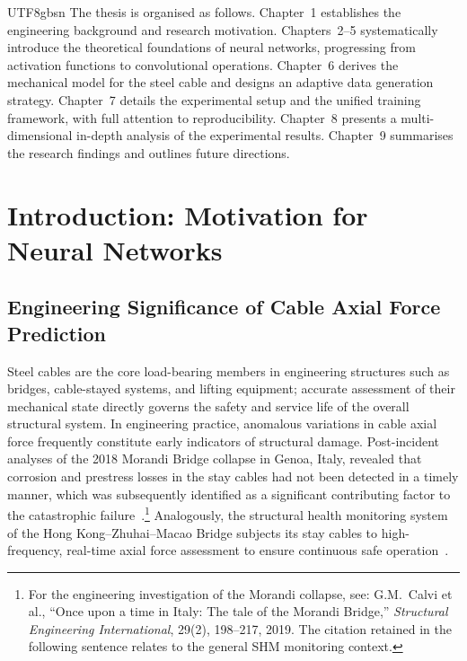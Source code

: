 \documentclass[a4paper,12pt]{report}
\begin{document}
\begin{CJK}{UTF8}{gbsn}
The thesis is organised as follows. Chapter~1 establishes the engineering background and
research motivation. Chapters~2--5 systematically introduce the theoretical foundations of
neural networks, progressing from activation functions to convolutional operations.
Chapter~6 derives the mechanical model for the steel cable and designs an adaptive data
generation strategy. Chapter~7 details the experimental setup and the unified training
framework, with full attention to reproducibility. Chapter~8 presents a multi-dimensional
in-depth analysis of the experimental results. Chapter~9 summarises the research findings
and outlines future directions.



\chapter{Introduction: Motivation for Neural Networks}
\label{chap:intro}

\section{Engineering Significance of Cable Axial Force Prediction}
\label{sec:intro_significance}

Steel cables are the core load-bearing members in engineering structures such as bridges,
cable-stayed systems, and lifting equipment; accurate assessment of their mechanical state
directly governs the safety and service life of the overall structural system. In engineering
practice, anomalous variations in cable axial force frequently constitute early indicators
of structural damage. Post-incident analyses of the 2018 Morandi Bridge collapse in Genoa,
Italy, revealed that corrosion and prestress losses in the stay cables had not been detected
in a timely manner, which was subsequently identified as a significant contributing factor
to the catastrophic failure~\cite{calvi2019morandi}.\footnote{For the engineering
investigation of the Morandi collapse, see: G.M.~Calvi et al., ``Once upon a time in
Italy: The tale of the Morandi Bridge,'' \textit{Structural Engineering International},
29(2), 198--217, 2019. The citation \cite{ni2010} retained in the following sentence
relates to the general SHM monitoring context.} Analogously, the structural health monitoring system
of the Hong Kong--Zhuhai--Macao Bridge subjects its stay cables to high-frequency,
real-time axial force assessment to ensure continuous safe operation~\cite{ni2010,xu2022cable,yu2021cable}.


\end{CJK}
\end{document}
